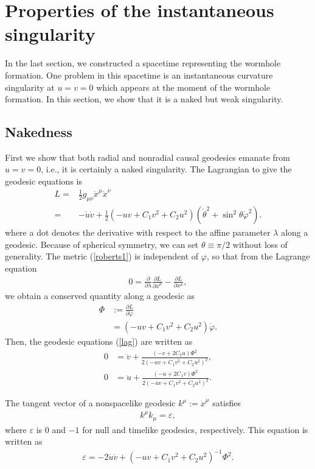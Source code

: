 \documentclass[aps,prd,twocolumn,eqsecnum,showpacs,amsmath]{revtex4}
\begin{document}


\section{Properties of the instantaneous singularity}
In the last section, we constructed a spacetime representing the wormhole formation.
One problem in this spacetime is an instantaneous curvature singularity at $u=v=0$ which appears at the moment of the wormhole formation.
In this section, we show that it is a naked but weak singularity.


\subsection{Nakedness}
First we show that both radial and nonradial causal geodesics emanate from $u=v=0$, i.e., it is certainly a naked singularity.
The Lagrangian to give the geodesic equations is 
\begin{align}
L=&\frac12g_{\mu\nu}{\dot x}^\mu{\dot x}^\nu \nonumber \\
=&-{\dot u}{\dot v}+\frac12(-uv+C_1v^2+C_2u^2)({\dot \theta}^2+\sin^2\theta{\dot \varphi}^2).
\end{align}  
where a dot denotes the derivative with respect to the affine parameter $\lambda$ along a geodesic.
Because of spherical symmetry, we can set $\theta \equiv \pi/2$ without loss of generality.
The metric (\ref{roberts1}) is independent of $\varphi$, so that from the Lagrange equation 
\begin{align}
0=\frac{\partial}{\partial \lambda}\frac{\partial L}{\partial {\dot x}^\mu}-\frac{\partial L}{\partial {x}^\mu},\label{lag}
\end{align}  
we obtain a conserved quantity along a geodesic as
\begin{align}
\Phi&:= \frac{\partial L}{\partial {\dot \varphi}} \nonumber \\
&=(-uv+C_1v^2+C_2u^2){\dot \varphi}. \label{angC}
\end{align}  
Then, the geodesic equations (\ref{lag}) are written as
\begin{align}
0&={\ddot v}+\frac{(-v+2C_2u)\Phi^2}{2(-uv+C_1v^2+C_2u^2)^2},\\
0&={\ddot u}+\frac{(-u+2C_1v)\Phi^2}{2(-uv+C_1v^2+C_2u^2)^2}.
\end{align}  

The tangent vector of a nonspacelike geodesic $k^\mu:={\dot x^\mu}$ satisfies
\begin{align}
k^\mu k_\mu=\varepsilon,
\end{align}  
where $\varepsilon$ is $0$ and $-1$ for null and timelike geodesics, respectively.
This equation is written as
\begin{align}
\varepsilon=-2{\dot u}{\dot v}+(-uv+C_1v^2+C_2u^2)^{-1}\Phi^2. 
\end{align}  
\end{document}
